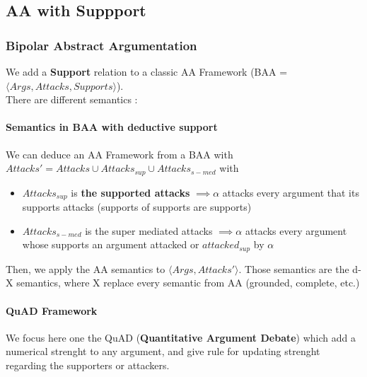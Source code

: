 	\subsection{AA with Suppport}

		\subsubsection[BAA]{Bipolar Abstract Argumentation}
			We add a \textbf{Support} relation to a classic AA Framework (BAA = $\langle Args, Attacks, Supports \rangle$). \\There are different semantics :

			\paragraph*{Semantics in BAA with deductive support}
			We can deduce an AA Framework from a BAA with $Attacks' = Attacks \cup Attacks_{sup} \cup Attacks_{s-med}$ with 
			\begin{definition}
				\begin{itemize}
					\item $Attacks_{sup}$ is \textbf{the supported attacks}  $\implies \alpha$ attacks every argument that its supports attacks (supports of supports are supports)
					\item $Attacks_{s-med}$ is the super mediated attacks  $ \implies \alpha$ attacks every argument whose supports an argument attacked or $attacked_{sup}$  by $\alpha$ 
				\end{itemize}
			\end{definition}

			Then, we apply the AA semantics to $\langle Args, Attacks' \rangle$. Those semantics are the d-X semantics, where X replace every semantic from AA (grounded, complete, etc.)
			\paragraph*{QuAD Framework}
			We focus here one the QuAD (\textbf{Quantitative Argument Debate}) which add a numerical strenght to any argument, and give rule for updating strenght regarding the supporters or attackers.
			

